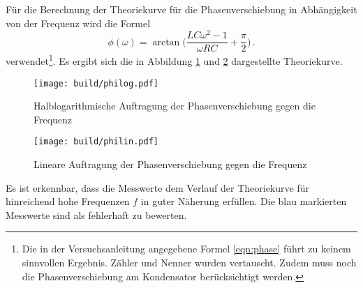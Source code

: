 Für die Berechnung der Theoriekurve für die Phasenverschiebung in Abhängigkeit
von der Frequenz wird die Formel
\begin{equation}
  \phi(\omega)=\arctan\biggl(\frac{L C \omega^2-1}{\omega R C}+\frac{\pi}{2}\biggr)\,.
\end{equation}
verwendet\footnote{Die in der Versuchsanleitung angegebene Formel \eqref{eqn:phase}
führt zu keinem sinnvollen Ergebnis. Zähler und Nenner wurden
vertauscht. Zudem muss noch die Phasenverschiebung am Kondensator berücksichtigt
werden.}.
Es ergibt sich die in Abbildung \ref{fig:philog2} und \ref{fig:philin2}
dargestellte Theoriekurve.


\begin{figure}
  \centering
  \texttt{[image: build/philog.pdf]}
  \caption{Halblogarithmische Auftragung der Phasenverschiebung gegen die Frequenz}
  \label{fig:philog2}
\end{figure}

\begin{figure}
  \centering
  \texttt{[image: build/philin.pdf]}
  \caption{Lineare Auftragung der Phasenverschiebung gegen die Frequenz}
  \label{fig:philin2}
\end{figure}

Es ist erkennbar, dass die Messwerte dem Verlauf der Theoriekurve für hinreichend
hohe Frequenzen $f$ in guter Näherung erfüllen. Die blau markierten Messwerte
sind als fehlerhaft zu bewerten.
